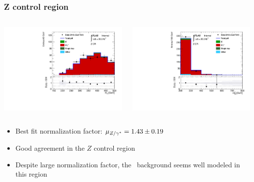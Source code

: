 \documentclass[10pt, svgnames]{beamer}
\begin{document}
\begin{frame}
  \frametitle{Z control region}
  \begin{columns}
    \begin{block}{\HT}
      \includegraphics[width=\textwidth]{figures/cr_Z_ht_signal.pdf}
    \end{block}
    \begin{block}{\MBL}
      \includegraphics[width=\textwidth]{figures/cr_Z_mbl_0.pdf}
    \end{block}
  \end{columns}
  \begin{itemize}
    \item Best fit normalization factor: $\mu_{Z/\gamma^{*}} = 1.43 \pm 0.19$
    \item Good agreement in the $Z$ control region
    \item Despite large normalization factor, the \ZGAMMA\ background seems
      well modeled in this region
  \end{itemize}
\end{frame}
\end{document}
